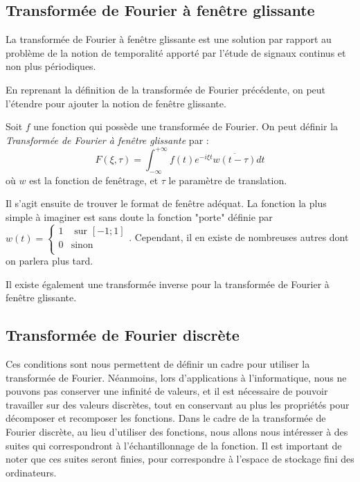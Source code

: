 	\newpage
	\subsection{Transformée de Fourier à fenêtre glissante}
	La transformée de Fourier à fenêtre glissante est une solution par rapport au problème de la notion de temporalité apporté par l'étude de signaux continus et non plus périodiques. 

	En reprenant la définition de la transformée de Fourier précédente, on peut l'étendre pour ajouter la notion de fenêtre glissante. 
		
	\begin{mydef}
		Soit $f$ une fonction qui possède une transformée de Fourier. On peut définir la \textit{Transformée de Fourier à fenêtre glissante} par :
		$$ F(\xi, \tau)= \int_{-\infty}^{+\infty}f(t)e^{-i \xi t} \overline{w(t - \tau)}dt$$
		où $w$ est la fonction de fenêtrage, et $\tau$ le paramètre de translation. 
	\end{mydef}
	Il s'agit ensuite de trouver le format de fenêtre adéquat. La fonction la plus simple à imaginer est sans doute la fonction "porte" définie par 
	$w(t) = \left\{
		\begin{array}{cc}
		1 & \text{ sur }[-1; 1] \\
		0 & \text{sinon} \\
		\end{array}
	\right. $.
	Cependant, il en existe de nombreuses autres dont on parlera plus tard. 
	
	\begin{myrem}
		Il existe également une transformée inverse pour la transformée de Fourier à fenêtre glissante. 
	\end{myrem}
	
	\subsection{Transformée de Fourier discrète}
			
	Ces conditions sont nous permettent de définir un cadre pour utiliser la transformée de Fourier. Néanmoins, lors d'applications à l'informatique, nous ne pouvons pas conserver une infinité de valeurs, et il est nécessaire de pouvoir travailler sur des valeurs discrètes, tout en conservant au plus les propriétés pour décomposer et recomposer les fonctions. 		
	Dans le cadre de la transformée de Fourier discrète, au lieu d'utiliser des fonctions, nous allons nous intéresser à des suites qui correspondront à l'échantillonnage de la fonction. Il est important de noter que ces suites seront finies, pour correspondre à l'espace de stockage fini des ordinateurs. 
	

